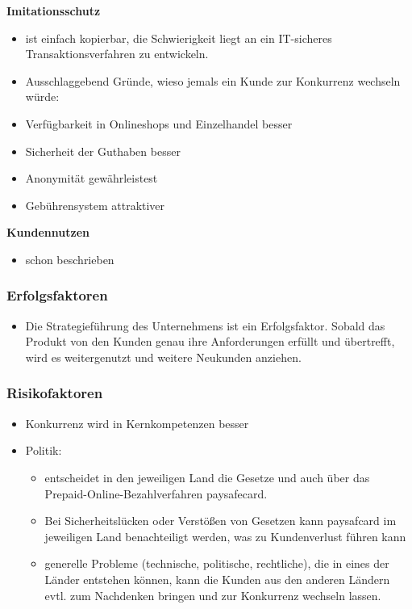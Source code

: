\textbf{Imitationsschutz}
\begin{itemize}
        \item ist einfach kopierbar, die Schwierigkeit liegt an ein IT-sicheres Transaktionsverfahren zu entwickeln.
        \item Ausschlaggebend Gründe, wieso jemals ein Kunde zur Konkurrenz wechseln würde:
        \item   Verfügbarkeit in Onlineshops und Einzelhandel besser
        \item   Sicherheit der Guthaben besser
        \item   Anonymität gewährleistest
        \item   Gebührensystem attraktiver
\end{itemize}

\textbf{Kundennutzen}
\begin{itemize}
        \item schon beschrieben

\end{itemize}



\subsubsection{Erfolgsfaktoren}
\begin{itemize}
        \item Die Strategieführung des Unternehmens ist ein Erfolgsfaktor. Sobald das Produkt von den Kunden genau ihre Anforderungen erfüllt und übertrefft, wird es weitergenutzt und weitere Neukunden anziehen.
\end{itemize}


\subsubsection{Risikofaktoren}
\begin{itemize}
        \item Konkurrenz wird in Kernkompetenzen besser
        \item Politik:
        
        \begin{itemize}
       		\item   entscheidet in den jeweiligen Land die Gesetze und auch über das Prepaid-Online-Bezahlverfahren paysafecard.
        	\item   Bei Sicherheitslücken oder Verstößen von Gesetzen kann paysafcard im jeweiligen Land benachteiligt werden, was zu Kundenverlust führen kann
        	\item   generelle Probleme (technische, politische, rechtliche), die in eines der Länder entstehen können, kann die Kunden aus den anderen Ländern evtl. zum Nachdenken bringen und zur Konkurrenz wechseln lassen.
        \end{itemize}
\end{itemize}



